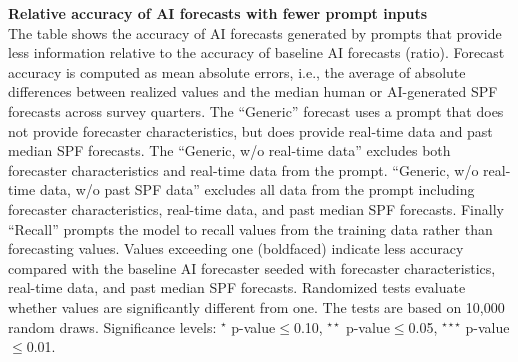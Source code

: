 \documentclass[11pt,letterpaper]{scrartcl}
\begin{document}

\thispagestyle{empty}
\begin{table}[h!]
    \centering
    \footnotesize{
    
    }
    \caption{
    \textbf{Relative accuracy of AI forecasts with fewer prompt inputs}
    \vspace{10pt}\\
    \footnotesize{The table shows the accuracy of AI forecasts generated by prompts that provide less information relative to the accuracy of baseline AI forecasts (ratio). Forecast accuracy is computed as mean absolute errors, i.e., the average of absolute differences between realized values and the median human or AI-generated SPF forecasts across survey quarters. The ``Generic'' forecast uses a prompt that does not provide forecaster characteristics, but does provide real-time data and past median SPF forecasts. The ``Generic, w/o real-time data'' excludes both forecaster characteristics and real-time data from the prompt. ``Generic, w/o real-time data, w/o past SPF data'' excludes all data from the prompt including forecaster characteristics, real-time data, and past median SPF forecasts. Finally ``Recall'' prompts the model to recall values from the training data rather than forecasting values. Values exceeding one (boldfaced) indicate less accuracy compared with the baseline AI forecaster seeded with forecaster characteristics, real-time data, and past median SPF forecasts. Randomized tests evaluate whether values are significantly different from one. The tests are based on 10,000 random draws. Significance levels: $^{\star}$ p-value$\leq$0.10, $^{\star\star}$ p-value$\leq$0.05, $^{\star\star\star}$ p-value$\leq$0.01.
    }}
    \label{tab:MAEs_forecastaccuracy_generic}
\end{table}

\end{document}
